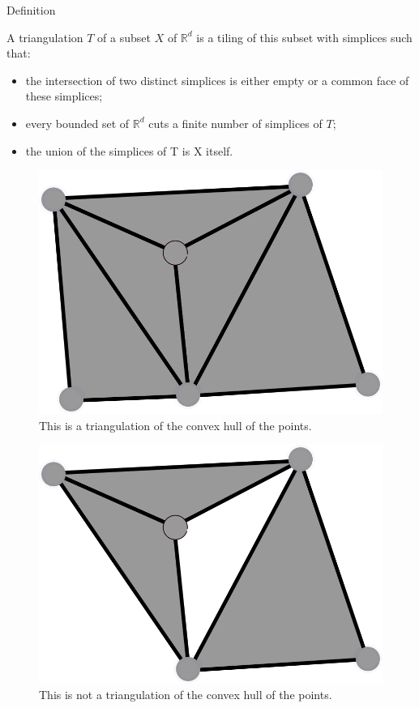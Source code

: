 \documentclass[18pt]{beamer}
\begin{document}
\begin{frame}{Definition}

 A triangulation $T$ of a subset $X$ of $\mathbb{R}^d$ is a tiling of this subset with simplices such
that:
\begin{itemize}
 \item<1-> the intersection of two distinct simplices is either empty or a common face of these simplices;
 \item<2-> every bounded set of $\mathbb{R}^d$ cuts a finite number of simplices of $T$;
 \item<3-> the union of the simplices of T is X itself.
\end{itemize}

\begin{overprint}
\begin{figure}
  \centering
  \includegraphics[scale=1.5]{Trig1}
  \caption{\label{Trig1} This is a triangulation of the convex hull of the points.}
\end{figure}

\begin{figure}
  \centering
  \includegraphics[scale=1.5]{NotTrig1}
  \caption{\label{NotTrig1} This is not a triangulation of the convex hull of the points.}
\end{figure}


\end{overprint}
\end{frame}
\end{document}
